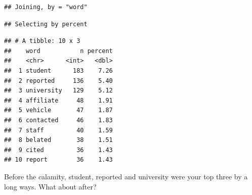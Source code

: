 \documentclass[]{book}
\newenvironment{Shaded}{\begin{snugshade}}{\end{snugshade}}
\newcommand{\DataTypeTok}[1]{\textcolor[rgb]{0.13,0.29,0.53}{#1}}
\newcommand{\DecValTok}[1]{\textcolor[rgb]{0.00,0.00,0.81}{#1}}
\newcommand{\KeywordTok}[1]{\textcolor[rgb]{0.13,0.29,0.53}{\textbf{#1}}}
\newcommand{\NormalTok}[1]{#1}
\newcommand{\OperatorTok}[1]{\textcolor[rgb]{0.81,0.36,0.00}{\textbf{#1}}}
\newcommand{\OtherTok}[1]{\textcolor[rgb]{0.56,0.35,0.01}{#1}}
\newcommand{\StringTok}[1]{\textcolor[rgb]{0.31,0.60,0.02}{#1}}
\begin{document}
\begin{Shaded}
\end{Shaded}

\begin{verbatim}
## Joining, by = "word"
\end{verbatim}

\begin{verbatim}
## Selecting by percent
\end{verbatim}

\begin{verbatim}
## # A tibble: 10 x 3
##    word           n percent
##    <chr>      <int>   <dbl>
##  1 student      183    7.26
##  2 reported     136    5.40
##  3 university   129    5.12
##  4 affiliate     48    1.91
##  5 vehicle       47    1.87
##  6 contacted     46    1.83
##  7 staff         40    1.59
##  8 belated       38    1.51
##  9 cited         36    1.43
## 10 report        36    1.43
\end{verbatim}

Before the calamity, student, reported and university were your top three by a long ways. What about after?

\begin{Shaded}
\end{Shaded}
\end{document}
